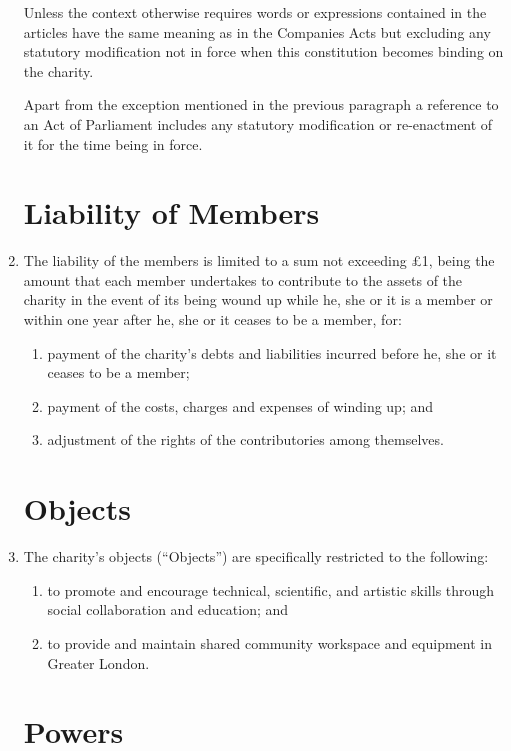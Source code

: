 \begin{enumerate}
  Unless the context otherwise requires words or expressions
  contained in the articles have the same meaning as in the Companies
  Acts but excluding any statutory modification not in force when
  this constitution becomes binding on the charity.

  Apart from the exception mentioned in the previous paragraph a
  reference to an Act of Parliament includes any statutory
  modification or re-enactment of it for the time being in force.

\section{Liability of Members}

\item
  The liability of the members is limited to a sum not exceeding £1,
  being the amount that each member undertakes to contribute to the
  assets of the charity in the event of its being wound up while he,
  she or it is a member or within one year after he, she or it ceases
  to be a member, for:
  \begin{enumerate}
  \item
    payment of the charity's debts and liabilities incurred before he,
    she or it ceases to be a member;
  \item
    payment of the costs, charges and expenses of winding up; and
  \item
    adjustment of the rights of the contributories among themselves.
  \end{enumerate}

\section{Objects}

\item
  The charity's objects (``Objects'') are specifically restricted to
  the following:
  \begin{enumerate}
  \item
    to promote and encourage technical, scientific, and artistic skills through social collaboration and education; and
  \item
    to provide and maintain shared community workspace and equipment in Greater London.
  \end{enumerate}

\section{Powers}


\end{enumerate}
